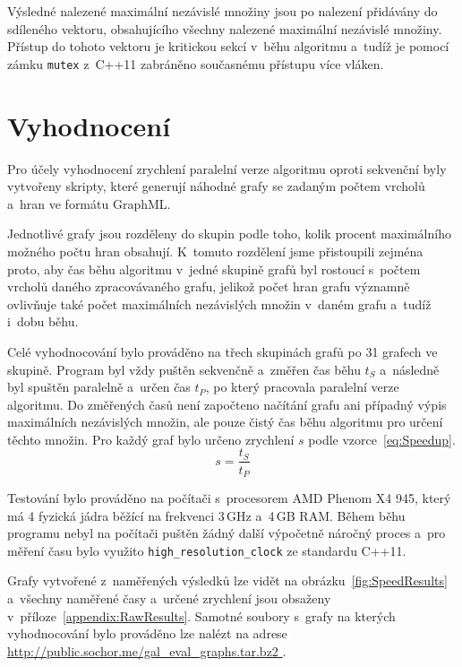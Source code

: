 \documentclass[12pt]{article}
\begin{document}
Výsledné nalezené maximální nezávislé množiny jsou po nalezení přidávány do sdíleného vektoru, obsahujícího všechny nalezené maximální nezávislé množiny. Přístup do tohoto vektoru je kritickou sekcí v~běhu algoritmu a~tudíž je pomocí zámku \texttt{mutex} z~C++11 zabráněno současnému přístupu více vláken.




\section{Vyhodnocení} \label{sec:Evaluation}
Pro účely vyhodnocení zrychlení paralelní verze algoritmu oproti sekvenční byly vytvořeny skripty, které generují náhodné grafy se zadaným počtem vrcholů a~hran ve formátu GraphML. 

Jednotlivé grafy jsou rozděleny do skupin podle toho, kolik procent maximálního možného počtu hran obsahují. K~tomuto rozdělení jsme přistoupili zejména proto, aby čas běhu algoritmu v~jedné skupině grafů byl rostoucí s~počtem vrcholů daného zpracovávaného grafu, jelikož počet hran grafu významně ovlivňuje také počet maximálních nezávislých množin v~daném grafu a~tudíž i~dobu běhu. 

Celé vyhodnocování bylo prováděno na třech skupinách grafů po 31 grafech ve skupině. Program byl vždy puštěn sekvenčně a~změřen čas běhu $t_S$ a~následně byl spuštěn paralelně a~určen čas $t_P$, po který pracovala paralelní verze algoritmu. Do změřených časů není započteno načítání grafu ani případný výpis maximálních nezávislých množin, ale pouze čistý čas běhu algoritmu pro určení těchto množin. Pro každý graf bylo určeno zrychlení $s$ podle vzorce~\ref{eq:Speedup}.
\begin{equation}
    s = \frac{t_S}{t_P} \label{eq:Speedup}
\end{equation}

Testování bylo prováděno na počítači s~procesorem AMD Phenom X4 945, který má 4 fyzická jádra běžící na frekvenci 3\,GHz a~4\,GB RAM. Během běhu programu nebyl na počítači puštěn žádný další výpočetně náročný proces a~pro měření času bylo využito \texttt{high\_resolution\_clock} ze standardu C++11.

Grafy vytvořené z~naměřených výsledků lze vidět na obrázku~\ref{fig:SpeedResults} a~všechny naměřené časy a~určené zrychlení jsou obsaženy v~příloze~\ref{appendix:RawResults}. Samotné soubory s~grafy na kterých vyhodnocování bylo prováděno lze nalézt na adrese \url{http://public.sochor.me/gal\_eval\_graphs.tar.bz2
}.
\end{document}
